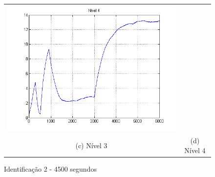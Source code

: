 \begin{figure}[H]
\begin{tabular}{cc}
		\includegraphics[height=0.15\paperheight,keepaspectratio]{img/sim2_h4.png} \\
		(c) Nível 3 &
		(d) Nível 4
	\end{tabular}
	\caption{\label{imgID_4500} Identificação 2 - 4500 segundos}
\end{figure}

